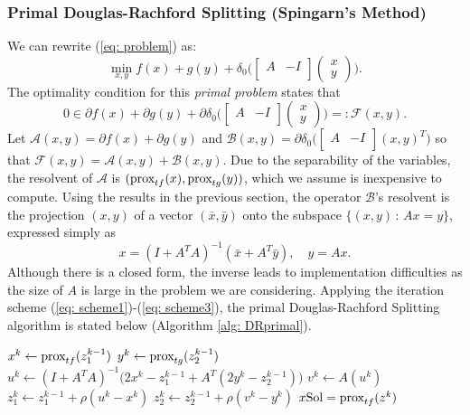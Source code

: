 \documentclass[12pt]{article}
\begin{document}
\subsubsection{Primal Douglas-Rachford Splitting (Spingarn's
  Method)} \label{sssec: DRprimal}
We can rewrite (\ref{eq: problem}) as:
\[ \min_{x,y} f(x)+g(y) + \delta_0 \big ( \begin{bmatrix} A & -I \\ \end{bmatrix} \begin{pmatrix} x\\ y \end{pmatrix} \big ).\]
The optimality condition for this \textit{primal problem} states that 
\[0 \in \partial f(x) + \partial
g(y) + \partial \delta_0 \big ( \begin{bmatrix} A & -I
  \\ \end{bmatrix} \begin{pmatrix} x\\ y \end{pmatrix} \big
) =: \mathcal{F}(x,y).\]
 Let $\mathcal{A}(x,y)
= \partial f(x) + \partial g(y)$ and $\mathcal{B}(x,y) = \partial \delta_0 \big ( \begin{bmatrix} A & -I
  \\ \end{bmatrix} (x,y)^T \big
)$ so that $\mathcal{F}(x,y) = \mathcal{A}(x,y) +
\mathcal{B}(x,y)$. Due to the separability of the variables, the
resolvent of $\mathcal{A}$ is $( \text{prox}_{tf}(x), \text{prox}_{tg}(y) )$, which
we assume is inexpensive to compute. Using the results in the previous
section, the operator $\mathcal{B}$'s resolvent is the projection $(x,y)$
of a vector $(\bar{x}, \bar{y})$ onto the subspace $\{(x,y) \, : \, Ax
= y\}$, expressed simply as
\[x = (I+A^TA)^{-1} (\bar{x} + A^T \bar{y}), \quad y = Ax.\]
Although there is a closed form, the inverse leads to implementation
difficulties as the size of $A$ is large in the problem we are considering. Applying the iteration
scheme (\ref{eq: scheme1})-(\ref{eq: scheme3}), the primal Douglas-Rachford Splitting
algorithm is stated below (Algorithm \ref{alg: DRprimal}).

\begin{algorithm}[h!]

 {
  $x^k \leftarrow \text{prox}_{tf}(z^{k-1}_1)$  
  $y^k \leftarrow \text{prox}_{tg}(z^{k-1}_2)$ \;
  $u^k \leftarrow (I+A^TA)^{-1} \big ( 2x^k-z^{k-1}_1 +
  A^T(2y^k-z^{k-1}_2) \big )$ 
  $v^k \leftarrow A(u^k)$ \;
  $z^k_1 \leftarrow z^{k-1}_1 + \rho(u^k-x^k)$ \;
  $z^k_2 \leftarrow z^{k-1}_2 + \rho(v^k-y^k)$ \;
} 
\Return $x\text{Sol} = \text{prox}_{tf}(z^k)$\;
\caption{Primal Douglas-Rachford Splitting}\label{alg: DRprimal} 
\end{algorithm}
\end{document}
